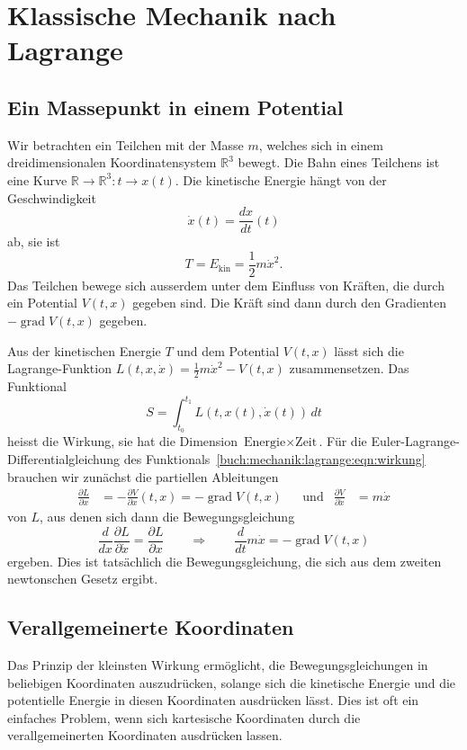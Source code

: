 %
%
%
\section{Klassische Mechanik nach Lagrange
\label{buch:mechanik:section:lagrange}}

%
%
\subsection{Ein Massepunkt in einem Potential}
Wir betrachten ein Teilchen mit der Masse $m$, welches sich in
einem dreidimensionalen Koordinatensystem $\mathbb{R}^3$ bewegt.
Die Bahn eines Teilchens ist eine Kurve
$\mathbb{R}\to\mathbb{R}^3:t\to x(t)$.
Die kinetische Energie hängt von der Geschwindigkeit 
\[
\dot{x}(t) = \frac{dx}{dt}(t)
\]
ab, sie ist
\[
T=
E_{\text{kin}}
=
\frac12 m\dot{x}^2.
\]
Das Teilchen bewege sich ausserdem unter dem Einfluss von Kräften,
die durch ein Potential $V(t,x)$ gegeben sind.
Die Kräft sind dann durch den Gradienten $-\operatorname{grad}V(t,x)$ 
gegeben.

Aus der kinetischen Energie $T$ und dem Potential $V(t,x)$ lässt sich
die Lagrange-Funktion $L(t,x,\dot{x}) = \frac12m\dot{x}^2-V(t,x)$ 
zusammensetzen.
Das Funktional
\begin{equation}
S
=
\int_{t_0}^{t_1}
L(t,x(t),\dot{x}(t))
\,dt
\label{buch:mechanik:lagrange:eqn:wirkung}
\end{equation}
heisst die Wirkung, sie hat die Dimension $\text{Energie}\times\text{Zeit}$.
Für die Euler-Lagrange-Differentialgleichung des
Funktionals~\eqref{buch:mechanik:lagrange:eqn:wirkung} brauchen wir
zunächst die partiellen Ableitungen
\begin{align*}
\frac{\partial L}{\partial x}
&=
-\frac{\partial V}{\partial x}(t,x)
=
-\operatorname{grad}V(t,x)
&&\text{und}&
\frac{\partial V}{\partial\dot{x}}
&=
m\dot{x}
\end{align*}
von $L$, aus denen sich dann die Bewegungsgleichung
\[
\frac{d}{dx}\frac{\partial L}{\partial\dot{x}}
=
\frac{\partial L}{\partial x}
\qquad\Rightarrow\qquad
\frac{d}{dt}m\dot{x}
=
-\operatorname{grad}V(t,x)
\]
ergeben. 
Dies ist tatsächlich die Bewegungsgleichung, die sich aus dem
zweiten newtonschen Gesetz ergibt.

%
%
\subsection{Verallgemeinerte Koordinaten}
Das Prinzip der kleinsten Wirkung ermöglicht, die Bewegungsgleichungen
in beliebigen Koordinaten auszudrücken, solange sich die kinetische
Energie und die potentielle Energie in diesen Koordinaten ausdrücken
lässt.
Dies ist oft ein einfaches Problem, wenn sich kartesische Koordinaten
durch die verallgemeinerten Koordinaten ausdrücken lassen.


